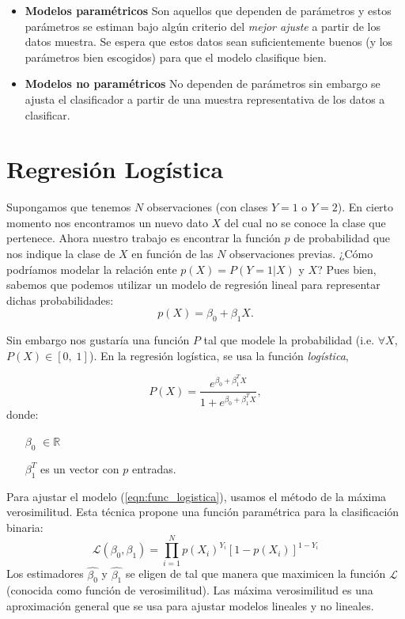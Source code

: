 \documentclass[11pt,letterpaper,reqno]{article}
\begin{document}
\begin{itemize}
	\item \textbf{Modelos paramétricos} Son aquellos que dependen de parámetros y estos parámetros se estiman bajo algún criterio del \textit{mejor ajuste} a partir de los datos muestra. Se espera que estos datos sean suficientemente buenos (y los parámetros bien escogidos) para que el modelo clasifique bien.
	\item \textbf{Modelos no paramétricos} No dependen de parámetros sin embargo se ajusta el clasificador a partir de una muestra representativa de los datos a clasificar.
\end{itemize}

\section{Regresión Logística}

Supongamos que tenemos $N$ observaciones (con clases $Y=1$ o $Y=2$). En cierto momento nos encontramos un nuevo dato $X$ del cual no se conoce la clase que pertenece. Ahora nuestro trabajo es encontrar la función $p$ de probabilidad que nos indique la clase de $X$ en función de las $N$ observaciones previas. ¿Cómo podríamos modelar la relación ente $p(X) = P(Y=1|X)$ y $X$? Pues bien, sabemos que podemos utilizar un modelo de regresión lineal para representar dichas probabilidades:
\begin{equation*}
p(X) = \beta_0 + \beta_1X.
\end{equation*}

Sin embargo nos gustaría una función $P$ tal que modele la probabilidad (i.e. $\forall X$, $P(X)\in[0,\; 1]$). En la regresión logística, se usa la función \textit{logística},

\begin{equation}
	\label{eqn:func_logistica}
	P(X) = \frac{e^{\beta_0 + \beta_1^{T} X}}{1+e^{\beta_0 + \beta_1^{T}X}},
\end{equation}
donde:
\begin{itemize}
	\item[$\beta_0$]$\in \mathbb{R}$
	\item[$\beta_1^T$] es un vector con $p$ entradas.
\end{itemize}
Para ajustar el modelo (\ref{eqn:func_logistica}), usamos el método de la máxima verosimilitud. Esta técnica propone una función paramétrica para la clasificación binaria:
\begin{equation}
	\label{eqn:func_L}
	\mathcal{L}(\beta_{0}, \beta_{1}) = \prod_{i=1}^{N}p(X_i)^{Y_i}[1-p(X_{i})]^{1-Y_i}
\end{equation}
Los estimadores $\hat{\beta_0}$ y $\hat{\beta_1}$ se eligen de tal que manera que maximicen la función $\mathcal{L}$ (conocida como función de verosimilitud). Las máxima verosimilitud es una aproximación general que se usa para ajustar modelos lineales y no lineales.\\
\end{document}
